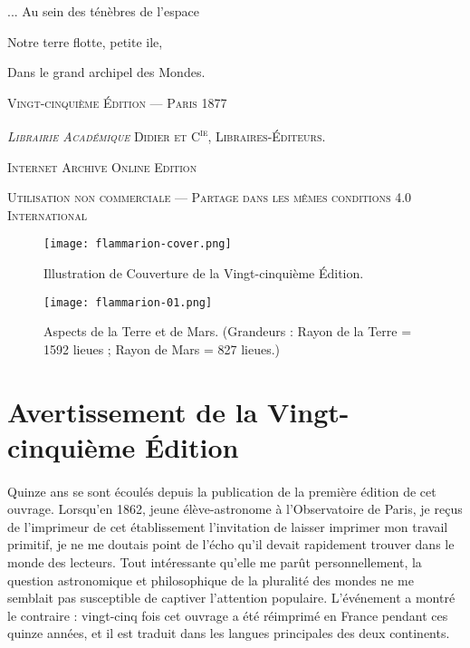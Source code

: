 \documentclass[a4paper, 11pt, oneside]{article}
\begin{document}
\begin{titlepage}
        {\begin{flushright}
        \small
        ... Au sein des ténèbres de l'espace
        
        Notre terre flotte, petite ile,
        
        Dans le grand archipel des Mondes.
        \end{flushright}}

        \vspace*{\fill}

	\vspace{1\baselineskip}

	{\small\scshape Vingt-cinquième Édition --- Paris 1877}
	
	{\small\scshape{\emph{Librairie Académique} Didier et C\textsuperscript{ie}, Libraires-Éditeurs.}}
	
	\vspace{0.5\baselineskip} %

        \scshape Internet Archive Online Edition  %
	
	{\scshape\small Utilisation non commerciale --- Partage dans les mêmes conditions 4.0 International} %
\end{titlepage}
\setlength{\parskip}{1mm plus1mm minus1mm}
\clearpage
\vspace*{\fill}
\begin{figure}[H]
\centering
\texttt{[image: flammarion-cover.png]}
\caption*{Illustration de Couverture de la Vingt-cinquième Édition.}
\end{figure}
\vspace*{\fill}
\clearpage
\tableofcontents
\clearpage
\vspace*{\fill}
\begin{figure}[H]
\centering
\texttt{[image: flammarion-01.png]}
\caption{Aspects de la Terre et de Mars. (Grandeurs : Rayon de la Terre = 1592 lieues ; Rayon de Mars = 827 lieues.)}
\end{figure}
\vspace*{\fill}
\clearpage
\section*{Avertissement de la Vingt-cinquième Édition}
\paragraph{}
Quinze ans se sont écoulés depuis la publication de la première édition de cet ouvrage. Lorsqu'en 1862, jeune élève-astronome à l'Observatoire de Paris, je reçus de l'imprimeur de cet établissement l'invitation de laisser imprimer mon travail primitif, je ne me doutais point de l'écho qu'il devait rapidement trouver dans le monde des lecteurs. Tout intéressante qu'elle me parût personnellement, la question astronomique et philosophique de la pluralité des mondes ne me semblait pas susceptible de captiver l'attention populaire. L'événement a montré le contraire : vingt-cinq fois cet ouvrage a été réimprimé en France pendant ces quinze années, et il est traduit dans les langues principales des deux continents.
\end{document}
